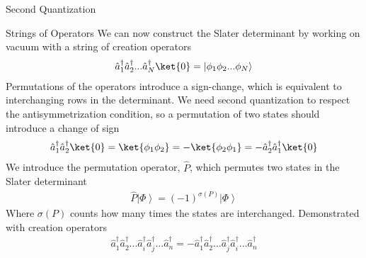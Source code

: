 \documentclass[twoside,english]{uiofysmaster}
\begin{document}
\begin{chapter}{Second Quantization}
	\begin{section}{Strings of Operators}
		We can now construct the Slater determinant by working on vacuum with a string of creation operators
		\begin{align}
			\hat a_1^{\dagger} \hat a_2^{\dagger}... \hat a_N^{\dagger} \ket{0} = \left| \phi_1 \phi_2 ... \phi_N \right>
		\end{align}
		Permutations of the operators introduce a sign-change, which is equivalent to interchanging rows in the determinant. We need second quantization to respect the antisymmetrization condition, so a permutation of two states should introduce a change of sign
		\begin{align}
			\hat a_1^{\dagger} \hat a_2^{\dagger} \ket{0} = \ket{\phi_1 \phi_2} = -\ket{\phi_2 \phi_1} = -\hat a_2^{\dagger} \hat a_1^{\dagger} \ket{0}
		\end{align}
		We introduce the permutation operator, $\hat P$, which permutes two states in the Slater determinant 
		\begin{align}
			\hat P \left| \Phi \right> = (-1)^{\sigma(P)} \left| \Phi \right>
		\end{align}
		Where $\sigma(P)$ counts how many times the states are interchanged. Demonstrated with creation operators
		\begin{align}
			\hat a_1^\dagger \hat a_2^\dagger ... \hat a_i^\dagger \hat a_j^\dagger ... \hat a_n^\dagger = - \hat a_1^\dagger \hat a_2^\dagger ... \hat a_j^\dagger \hat a_i^\dagger ... \hat a_n^\dagger
		\end{align}
	\end{section}


\end{chapter}
\end{document}
